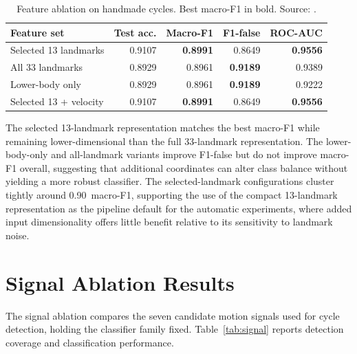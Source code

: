 \begin{table}[htbp]
\centering
\caption[Feature ablation on handmade cycles. Source: \protect{}.]{Feature ablation on handmade cycles. Best macro-F1 in bold. Source: .}
\label{tab:feature-ablation}
\small
\begin{tabular}{lrrrr}
\toprule
Feature set & Test acc. & Macro-F1 & F1-false & ROC-AUC \\
\midrule
Selected 13 landmarks & 0.9107 & \textbf{0.8991} & 0.8649 & \textbf{0.9556} \\
All 33 landmarks & 0.8929 & 0.8961 & \textbf{0.9189} & 0.9389 \\
Lower-body only & 0.8929 & 0.8961 & \textbf{0.9189} & 0.9222 \\
Selected 13 + velocity & 0.9107 & \textbf{0.8991} & 0.8649 & \textbf{0.9556} \\
\bottomrule
\end{tabular}
\end{table}

The selected 13-landmark representation matches the best macro-F1 while
remaining lower-dimensional than the full 33-landmark representation. The
lower-body-only and all-landmark variants improve F1-false but do not improve
macro-F1 overall, suggesting that additional coordinates can alter class
balance without yielding a more robust classifier. The selected-landmark
configurations cluster tightly around 0.90~macro-F1, supporting the use of the
compact 13-landmark representation as the pipeline default for the automatic
experiments, where added input dimensionality offers little benefit relative
to its sensitivity to landmark noise.

\section{Signal Ablation Results}
\label{sec:signal-ablation}

The signal ablation compares the seven candidate motion signals used for
cycle detection, holding the classifier family fixed. Table~\ref{tab:signal}
reports detection coverage and classification performance.

